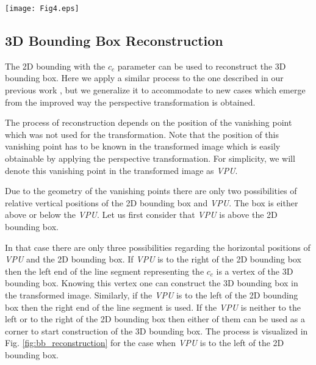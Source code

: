\documentclass[twocolumn]{svjour3}          \smartqed  \usepackage{graphicx}
\begin{document}
\begin{figure*}[]
   \centering
   \texttt{[image: Fig4.eps]}
   \caption{The process of reconstructing the 3D bounding box (solid green) from the known 2D bounding box (dashed black), the line given by the $c_c$ parameter (dotted blue) and the position of the \textit{VPU} (red cross). The process begins in the top left of the figure. Line segments originating in the \textit{VPU} (red dotted) are used when needed to determine the corners and edges of the 3D bounding box.}
   \label{fig:bb_reconstruction}
\end{figure*}


\subsection{3D Bounding Box Reconstruction}
\label{sec:VPU}

The 2D bounding with the $c_c$ parameter can be used to reconstruct the 3D bounding box. Here we apply a similar process to the one described in our previous work \cite{CVWW2019}, but we generalize it to accommodate to new cases which emerge from the improved way the perspective transformation is obtained. 

The process of reconstruction depends on the position of the vanishing point which was not used for the transformation. Note that the position of this vanishing point has to be known in the transformed image which is easily obtainable by applying the perspective transformation. For simplicity, we will denote this vanishing point in the transformed image as \textit{VPU}. 

Due to the geometry of the vanishing points there are only two possibilities of relative vertical positions of the 2D bounding box and \textit{VPU}. The box is either above or below the \textit{VPU}. Let us first consider that \textit{VPU} is above the 2D bounding box. 

In that case there are only three possibilities regarding the horizontal positions of \textit{VPU} and the 2D bounding box. If \textit{VPU} is to the right of the 2D bounding box then the left end of the line segment representing the $c_c$ is a vertex of the 3D bounding box. Knowing this vertex one can construct the 3D bounding box in the transformed image. Similarly, if the \textit{VPU} is to the left of the 2D bounding box then the right end of the line segment is used. If the \textit{VPU} is neither to the left or to the right of the 2D bounding box then either of them can be used as a corner to start construction of the 3D bounding box. The process is visualized in Fig. \ref{fig:bb_reconstruction} for the case when \textit{VPU} is to the left of the 2D bounding box.
\end{document}
